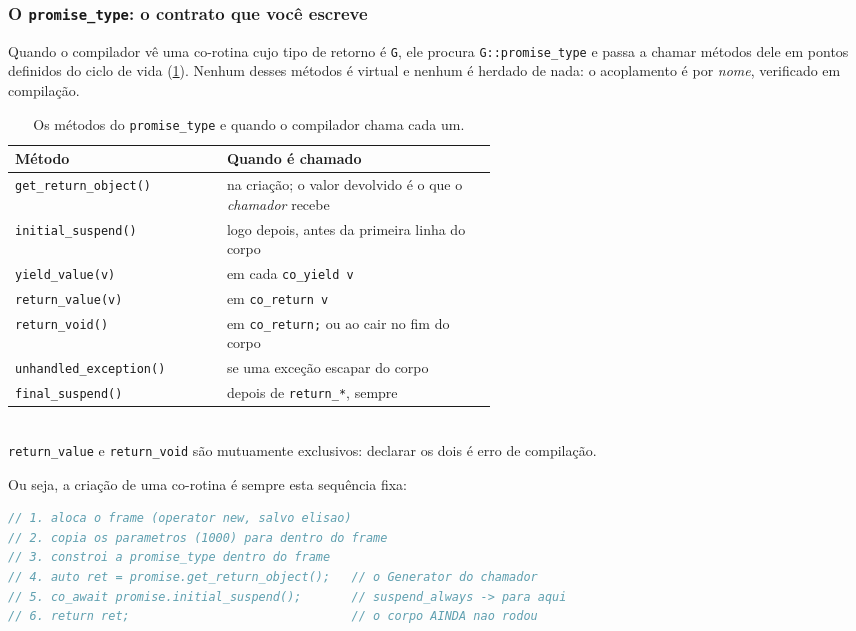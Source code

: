 \subsubsection{O \texttt{promise\_type}: o contrato que você escreve}

Quando o compilador vê uma co-rotina cujo tipo de retorno é \texttt{G}, ele
procura \texttt{G::promise\_type} e passa a chamar métodos dele em pontos
definidos do ciclo de vida (\cref{tab:promise-type}). Nenhum desses métodos é
virtual e nenhum é herdado de nada: o acoplamento é por \emph{nome}, verificado
em compilação.

\begin{table}[htbp]
\centering
\caption{Os métodos do \texttt{promise\_type} e quando o compilador chama cada um.}
\label{tab:promise-type}
\footnotesize
\begin{tabular}{@{}lp{0.56\linewidth}@{}}
\toprule
\textbf{Método} & \textbf{Quando é chamado} \\
\midrule
\texttt{get\_return\_object()} & na criação; o valor devolvido é o que o
                                 \emph{chamador} recebe \\
\texttt{initial\_suspend()}    & logo depois, antes da primeira linha do corpo \\
\texttt{yield\_value(v)}       & em cada \texttt{co\_yield v} \\
\texttt{return\_value(v)}      & em \texttt{co\_return v} \\
\texttt{return\_void()}        & em \texttt{co\_return;} ou ao cair no fim do corpo \\
\texttt{unhandled\_exception()}& se uma exceção escapar do corpo \\
\texttt{final\_suspend()}      & depois de \texttt{return\_*}, sempre \\
\bottomrule
\end{tabular}\\[2pt]
\footnotesize \texttt{return\_value} e \texttt{return\_void} são mutuamente
exclusivos: declarar os dois é erro de compilação.
\end{table}

Ou seja, a criação de uma co-rotina é sempre esta sequência fixa:

\begin{lstlisting}[style=bt, language=C++,
    caption={O que \texttt{auto g = fibonacci(1000);} realmente executa.}]
// 1. aloca o frame (operator new, salvo elisao)
// 2. copia os parametros (1000) para dentro do frame
// 3. constroi a promise_type dentro do frame
// 4. auto ret = promise.get_return_object();   // o Generator do chamador
// 5. co_await promise.initial_suspend();       // suspend_always -> para aqui
// 6. return ret;                               // o corpo AINDA nao rodou
\end{lstlisting}

